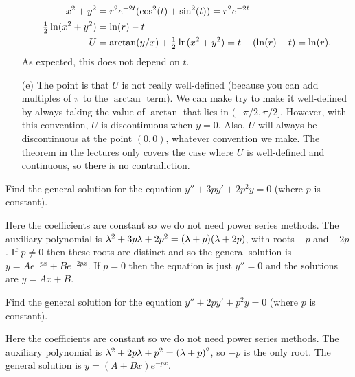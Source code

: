 \documentclass[a4paper]{amsart}
\begin{document}
\begin{solution}
\begin{itemize}
\begin{align*}
    x^2+y^2 &= r^2e^{-2t}(\cos^2(t)+\sin^2(t)) = r^2e^{-2t} \\
    \tfrac{1}{2}\ln(x^2+y^2) &= \ln(r)-t \\
    U &= \arctan(y/x) + \tfrac{1}{2}\ln(x^2+y^2)
       = t + (\ln(r)-t) = \ln(r).
   \end{align*}
   As expected, this does not depend on $t$.
  \item[(e)] The point is that $U$ is not really well-defined (because
   you can add multiples of $\pi$ to the $\arctan$ term).  We can make
   try to make it well-defined by always taking the value of $\arctan$
   that lies in $(-\pi/2,\pi/2]$.  However, with this convention, $U$
   is discontinuous when $y=0$.  Also, $U$ will always be
   discontinuous at the point $(0,0)$, whatever convention we make.
   The theorem in the lectures only covers the case where $U$ is
   well-defined and continuous, so there is no contradiction.
 \end{itemize}
\end{solution}

\begin{exercise}\label{ex-const-coeff-a}
 Find the general solution for the equation $y''+3py'+2p^2y=0$ (where $p$ is constant).
\end{exercise}
\begin{solution}
 Here the coefficients are constant so we do not need power series
 methods.  The auxiliary polynomial is
 $\lambda^2+3p\lambda+2p^2=(\lambda+p)(\lambda+2p)$, with roots $-p$ and $-2p$.  If
 $p\neq 0$ then these roots are distinct and so the general solution
 is $y=Ae^{-px}+Be^{-2px}$.  If $p=0$ then the equation is just
 $y''=0$ and the solutions are $y=Ax+B$.
\end{solution}

\begin{exercise}\label{ex-const-coeff-b}
 Find the general solution for the equation $y''+2py'+p^2y=0$ (where $p$ is constant).
\end{exercise}
\begin{solution}
 Here the coefficients are constant so we do not need power series
 methods.  The auxiliary polynomial is
 $\lambda^2+2p\lambda+p^2=(\lambda+p)^2$, so $-p$ is the only root.  The general
 solution is $y=(A+Bx)e^{-px}$.
\end{solution}
\end{document}

